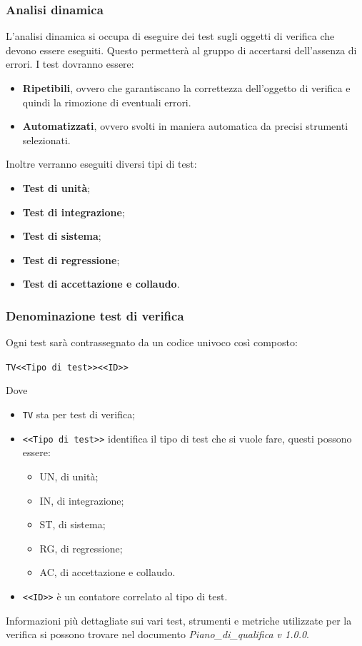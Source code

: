\subsubsection{Analisi dinamica}
L'analisi dinamica si occupa di eseguire dei test sugli oggetti di verifica che devono essere eseguiti. Questo permetterà al gruppo di accertarsi dell'assenza di errori.
I test dovranno essere:
\begin{itemize}
	\item \textbf{Ripetibili}, ovvero che garantiscano la correttezza dell'oggetto di verifica e quindi la rimozione di eventuali errori.
	\item \textbf{Automatizzati}, ovvero svolti in maniera automatica da precisi strumenti selezionati.
\end{itemize}
Inoltre verranno eseguiti diversi tipi di test:
\begin{itemize}
	\item \textbf{Test di unità};
	\item \textbf{Test di integrazione};
	\item \textbf{Test di sistema};
	\item \textbf{Test di regressione};
	\item \textbf{Test di accettazione e collaudo}.
\end{itemize}
\subsubsection{Denominazione test di verifica}
Ogni test sarà contrassegnato da un codice univoco così composto:
\begin{center}
	\verb|TV<<Tipo di test>><<ID>>|
\end{center}
Dove 
\begin{itemize}
	\item \verb|TV| sta per test di verifica;
	\item \verb|<<Tipo di test>>| identifica il tipo di test che si vuole fare, questi possono essere:
	\begin{itemize}
		\item UN, di unità;
		\item IN, di integrazione;
		\item ST, di sistema;
		\item RG, di regressione;
		\item AC, di accettazione e collaudo.
	\end{itemize}
	\item \verb|<<ID>>| è un contatore correlato al tipo di test.
\end{itemize}
Informazioni più dettagliate sui vari test, strumenti e metriche utilizzate per la verifica si possono trovare nel documento \textit{Piano\_di\_qualifica v 1.0.0}.


